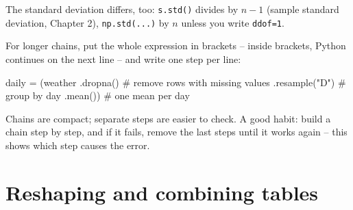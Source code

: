 \documentclass[
  letterpaper,
  DIV=11,
  numbers=noendperiod]{scrreprt}
\newenvironment{Shaded}{\begin{snugshade}}{\end{snugshade}}
\newcommand{\CommentTok}[1]{\textcolor[rgb]{0.37,0.37,0.37}{#1}}
\newcommand{\NormalTok}[1]{\textcolor[rgb]{0.00,0.23,0.31}{#1}}
\newcommand{\OperatorTok}[1]{\textcolor[rgb]{0.37,0.37,0.37}{#1}}
\newcommand{\StringTok}[1]{\textcolor[rgb]{0.13,0.47,0.30}{#1}}
\begin{document}
\begin{tcolorbox}
The standard deviation differs, too: \texttt{s.std()} divides by \(n-1\)
(sample standard deviation, Chapter 2), \texttt{np.std(...)} by \(n\)
unless you write \texttt{ddof=1}.

For longer chains, put the whole expression in brackets -- inside
brackets, Python continues on the next line -- and write one step per
line:

\begin{Shaded}
\begin{Highlighting}[]
\NormalTok{daily }\OperatorTok{=}\NormalTok{ (weather}
\NormalTok{         .dropna()            }\CommentTok{\# remove rows with missing values}
\NormalTok{         .resample(}\StringTok{"D"}\NormalTok{)       }\CommentTok{\# group by day}
\NormalTok{         .mean())             }\CommentTok{\# one mean per day}
\end{Highlighting}
\end{Shaded}

Chains are compact; separate steps are easier to check. A good habit:
build a chain step by step, and if it fails, remove the last steps until
it works again -- this shows which step causes the error.

\end{tcolorbox}

\section{Reshaping and combining
tables}\label{reshaping-and-combining-tables}
\end{document}
